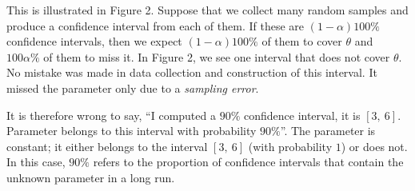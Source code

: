This is illustrated in Figure 2. Suppose that we collect many random samples and produce a confidence interval from each of them. If these are $(1 - \alpha)100\%$ confidence intervals, then we expect $(1 - \alpha)100\%$ of them to cover $\theta$ and $100\alpha\%$ of them to miss it. In Figure 2, we see one interval that does not cover $\theta$. No mistake was made in data collection and construction of this interval. It missed the parameter only due to a \textit{sampling error}.

It is therefore wrong to say, ``I computed a $90\%$ confidence interval, it is $\left[ 3,\ 6 \right]$. Parameter belongs to this interval with probability $90\%$''. The parameter is constant; it either belongs to the interval $\left[ 3,\ 6 \right]$ (with probability $1$) or does not. In this case, $90\%$ refers to the proportion of confidence intervals that contain the unknown parameter in a long run.










